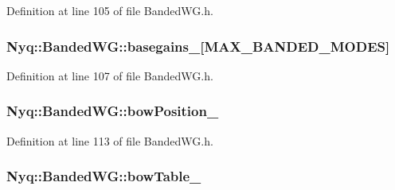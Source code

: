 Definition at line 105 of file Banded\+W\+G.\+h.

\subsubsection[{\texorpdfstring{basegains\+\_\+}{basegains_}}]{ Nyq\+::\+Banded\+W\+G\+::basegains\+\_\+\mbox{[}{\bf M\+A\+X\+\_\+\+B\+A\+N\+D\+E\+D\+\_\+\+M\+O\+D\+ES}\mbox{]}\hspace{0.3cm}{\ttfamily [protected]}}\hypertarget{class_nyq_1_1_banded_w_g_a08b6dfb8cc487d60654c509106c81132}{}\label{class_nyq_1_1_banded_w_g_a08b6dfb8cc487d60654c509106c81132}


Definition at line 107 of file Banded\+W\+G.\+h.

\subsubsection[{\texorpdfstring{bow\+Position\+\_\+}{bowPosition_}}]{ Nyq\+::\+Banded\+W\+G\+::bow\+Position\+\_\+\hspace{0.3cm}{\ttfamily [protected]}}\hypertarget{class_nyq_1_1_banded_w_g_ad26a7e40e6869cf6dd8afb83f71e2069}{}\label{class_nyq_1_1_banded_w_g_ad26a7e40e6869cf6dd8afb83f71e2069}


Definition at line 113 of file Banded\+W\+G.\+h.

\subsubsection[{\texorpdfstring{bow\+Table\+\_\+}{bowTable_}}]{ Nyq\+::\+Banded\+W\+G\+::bow\+Table\+\_\+\hspace{0.3cm}{\ttfamily [protected]}}\hypertarget{class_nyq_1_1_banded_w_g_ac0234d1c1d5575efb283321e11f2e938}{}\label{class_nyq_1_1_banded_w_g_ac0234d1c1d5575efb283321e11f2e938}


